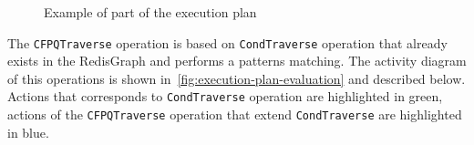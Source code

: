 \begin{figure}[h]
    \centering        
    \caption{Example of part of the execution plan}
    \label{fig:execution-plan-operations}
\end{figure}

The \lstinline{CFPQTraverse} operation is based on \lstinline{CondTraverse} operation that already exists in the RedisGraph and performs a patterns matching. The activity diagram of this operations is shown in~\autoref{fig:execution-plan-evaluation} and described below. Actions that corresponds to \lstinline{CondTraverse} operation are highlighted in green, actions of the \lstinline{CFPQTraverse} operation that extend \lstinline{CondTraverse} are highlighted in blue.

